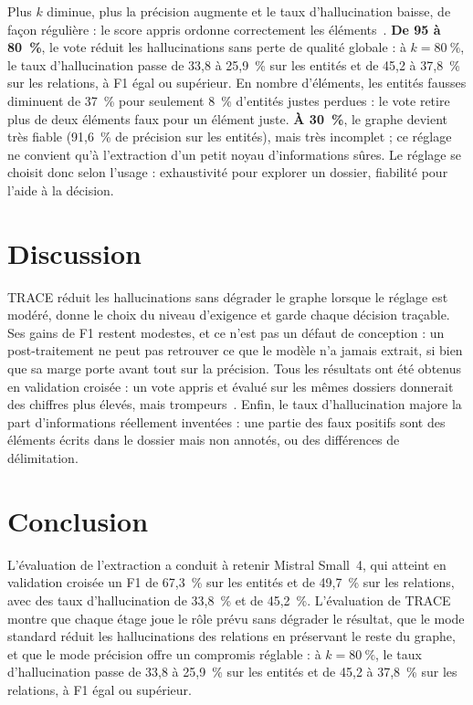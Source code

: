 Plus $k$ diminue, plus la précision augmente et le taux d'hallucination baisse, de façon régulière : le score appris ordonne correctement les éléments~\cite{chow1970reject,geifman2017selective}. \textbf{De 95 à 80~\%}, le vote réduit les hallucinations sans perte de qualité globale : à $k = 80~\%$, le taux d'hallucination passe de 33,8 à 25,9~\% sur les entités et de 45,2 à 37,8~\% sur les relations, à F1 égal ou supérieur. En nombre d'éléments, les entités fausses diminuent de 37~\% pour seulement 8~\% d'entités justes perdues : le vote retire plus de deux éléments faux pour un élément juste. \textbf{À 30~\%}, le graphe devient très fiable (91,6~\% de précision sur les entités), mais très incomplet ; ce réglage ne convient qu'à l'extraction d'un petit noyau d'informations sûres. Le réglage se choisit donc selon l'usage : exhaustivité pour explorer un dossier, fiabilité pour l'aide à la décision.

\section{Discussion}\label{sec:c6-bilan}\label{sec:c6-discussion-generale}

TRACE réduit les hallucinations sans dégrader le graphe lorsque le réglage est modéré, donne le choix du niveau d'exigence et garde chaque décision traçable. Ses gains de F1 restent modestes, et ce n'est pas un défaut de conception : un post-traitement ne peut pas retrouver ce que le modèle n'a jamais extrait, si bien que sa marge porte avant tout sur la précision. Tous les résultats ont été obtenus en validation croisée : un vote appris et évalué sur les mêmes dossiers donnerait des chiffres plus élevés, mais trompeurs~\cite{hastie2009elements}. Enfin, le taux d'hallucination majore la part d'informations réellement inventées : une partie des faux positifs sont des éléments écrits dans le dossier mais non annotés, ou des différences de délimitation.

\section{Conclusion}\label{sec:c6-conclusion}

L'évaluation de l'extraction a conduit à retenir Mistral Small~4, qui atteint en validation croisée un F1 de 67,3~\% sur les entités et de 49,7~\% sur les relations, avec des taux d'hallucination de 33,8~\% et de 45,2~\%. L'évaluation de TRACE montre que chaque étage joue le rôle prévu sans dégrader le résultat, que le mode standard réduit les hallucinations des relations en préservant le reste du graphe, et que le mode précision offre un compromis réglable : à $k = 80~\%$, le taux d'hallucination passe de 33,8 à 25,9~\% sur les entités et de 45,2 à 37,8~\% sur les relations, à F1 égal ou supérieur.
